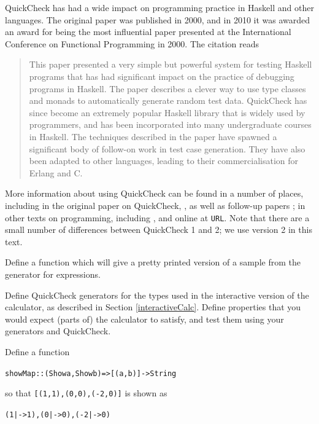 QuickCheck has had a wide impact on programming practice in Haskell and other languages. The original paper was published in 2000, and in 2010 it was awarded an award for being the most influential paper presented at the International Conference on Functional Programming in 2000. The citation reads 
\begin{quote}This paper presented a very simple but powerful system for testing Haskell programs that has had significant impact on the practice of debugging programs in Haskell. The paper describes a clever way to use type classes and monads to automatically generate random test data. QuickCheck has since become an extremely popular Haskell library that is widely used by programmers, and has been incorporated into many undergraduate courses in Haskell. The techniques described in the paper have spawned a significant body of follow-on work in test case generation. They have also been adapted to other languages, leading to their commercialisation for Erlang and C.\end{quote}
More information about using QuickCheck can be found in a number of places, including
in the original paper on QuickCheck, \cite{quickCheck}, as well as follow-up papers \cite{monadicQC,specBasedTesting};
in other texts on programming, including \cite{realWorldHaskell}, and
online at \texttt{URL}. Note that there are a small number of differences between QuickCheck 1 and 2; we use version 2 in this text.




\begin{exercises}
\item
Define a function which will give a pretty printed version of a sample from the generator for expressions.

\item
Define QuickCheck generators for the types used in the interactive version of the calculator, as described in Section \ref{interactiveCalc}. Define properties that you would expect (parts of) the calculator to satisfy, and test them using your generators and QuickCheck.

\item
Define a function
\begin{alltt}
  showMap :: (Show a, Show b) => [(a,b)] -> String
\end{alltt}
so that \texttt{[(1,1),(0,0),(-2,0)]} is shown as
\begin{alltt}
  (1|->1) ,(0|->0) ,(-2|->0)
\end{alltt}

\end{exercises}

